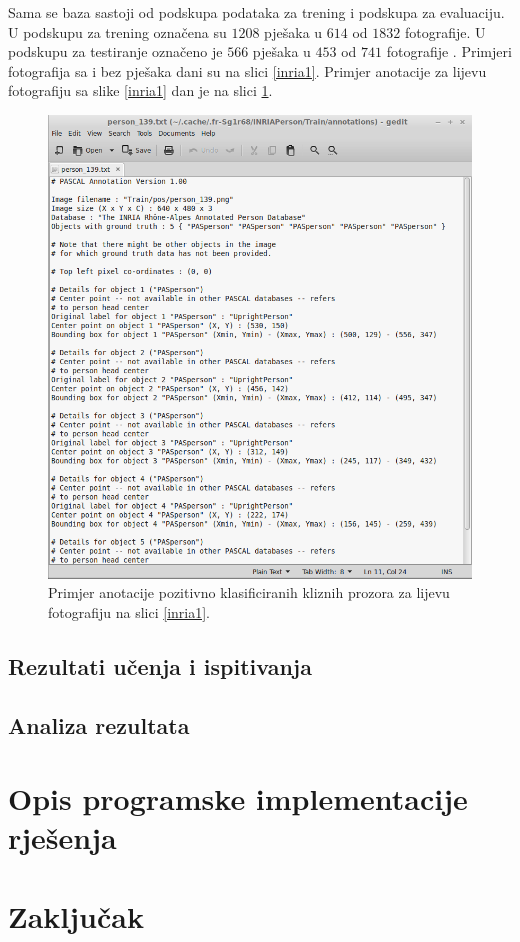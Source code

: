 \documentclass[seminar]{fer}
\begin{document}
Sama se baza sastoji od podskupa podataka za trening i podskupa za evaluaciju. U podskupu za trening označena su $1208$ pješaka u $614$ od $1832$ fotografije. U podskupu za testiranje označeno je $566$ pješaka u $453$ od $741$ fotografije \cite{Dollar:2012:PDE:2197081.2197275}.  Primjeri fotografija sa i bez pješaka dani su na slici \ref{inria1}. Primjer anotacije za lijevu fotografiju sa slike \ref{inria1} dan je na slici \ref{inria2}.

\begin{figure}[h!]
\centering
\includegraphics[scale=0.3]{img/annot_139.png}
\caption{Primjer anotacije pozitivno klasificiranih kliznih prozora za lijevu fotografiju na slici \ref{inria1}.}
\label{inria2}
\end{figure}

\section{Rezultati učenja i ispitivanja}

\section{Analiza rezultata}

\chapter{Opis programske implementacije rješenja}

\chapter{Zaključak}



\end{document}
